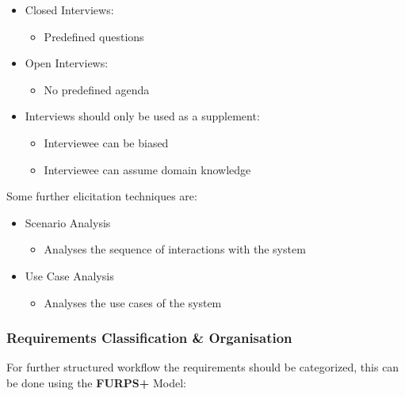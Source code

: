 \documentclass[
../../Software_Engineering_Summary.tex,
]
{subfiles}
\begin{document}
\begin{greenbox}
    \begin{itemize}
        \item Closed Interviews:
        \begin{itemize}
            \item Predefined questions
        \end{itemize}
        \item Open Interviews:
        \begin{itemize}
            \item No predefined agenda 
        \end{itemize}
        \item Interviews should only be used as a supplement:
        \begin{itemize}
            \item Interviewee can be biased
            \item Interviewee can assume domain knowledge
        \end{itemize}
    \end{itemize}
\end{greenbox}

Some further elicitation techniques are:

\begin{greenbox}
    \begin{itemize}
        \item Scenario Analysis
        \begin{itemize}
            \item Analyses the sequence of interactions with the system
        \end{itemize}
        \item Use Case Analysis
        \begin{itemize}
            \item Analyses the use cases of the system
        \end{itemize}
    \end{itemize}
\end{greenbox}

\subsubsection{Requirements Classification \& Organisation}
For further structured workflow the requirements should be categorized, this can be done using the \textbf{FURPS+} Model:
\end{document}
